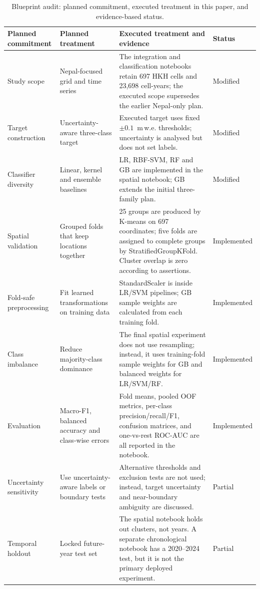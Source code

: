 \documentclass[conference]{IEEEtran}
\newcommand{\mwe}{m\,w.e.}
\begin{document}
\begin{table}[t]
\caption{Blueprint audit: planned commitment, executed treatment in this paper, and evidence-based status.}
\label{tab:fidelity}
\centering\footnotesize
\setlength{\tabcolsep}{3pt}
\begin{tabular}{p{}p{}p{}p{}}
\toprule
Planned commitment & Planned treatment & Executed treatment and evidence & Status\\
\midrule
Study scope & Nepal-focused grid and time series & The integration and classification notebooks retain 697 HKH cells and 23,698 cell-years; the executed scope supersedes the earlier Nepal-only plan. & Modified\\
Target construction & Uncertainty-aware three-class target & Executed target uses fixed $\pm0.1$~\mwe{} thresholds; uncertainty is analysed but does not set labels. & Modified\\
Classifier diversity & Linear, kernel and ensemble baselines & LR, RBF-SVM, RF and GB are implemented in the spatial notebook; GB extends the initial three-family plan. & Modified\\
Spatial validation & Grouped folds that keep locations together & 25 groups are produced by K-means on 697 coordinates; five folds are assigned to complete groups by StratifiedGroupKFold. Cluster overlap is zero according to assertions. & Implemented\\
Fold-safe preprocessing & Fit learned transformations on training data & StandardScaler is inside LR/SVM pipelines; GB sample weights are calculated from each training fold. & Implemented\\
Class imbalance & Reduce majority-class dominance & The final spatial experiment does not use resampling; instead, it uses training-fold sample weights for GB and balanced weights for LR/SVM/RF. & Implemented\\
Evaluation & Macro-F1, balanced accuracy and class-wise errors & Fold means, pooled OOF metrics, per-class precision/recall/F1, confusion matrices, and one-vs-rest ROC-AUC are all reported in the notebook. & Implemented\\
Uncertainty sensitivity & Use uncertainty-aware labels or boundary tests & Alternative thresholds and exclusion tests are not used; instead, target uncertainty and near-boundary ambiguity are discussed. & Partial\\
Temporal holdout & Locked future-year test set & The spatial notebook holds out clusters, not years. A separate chronological notebook has a 2020--2024 test, but it is not the primary deployed experiment. & Partial\\

\end{tabular}
\end{table}
\end{document}
